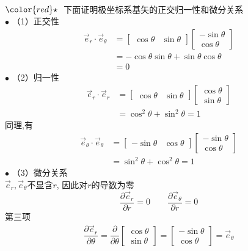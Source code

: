 	~~\\ 
	${\color{red}\star}~$ 下面证明极坐标系基矢的正交归一性和微分关系\\
	$\bullet$ 
	（1）正交性
	$$\begin{aligned}
		\vec{e}_r \cdot \vec{e}_\theta  &= \left[\begin{array}{ccc}
			\cos \theta  &
			\sin \theta 
		\end{array}\right] \left[\begin{array}{ccc}
			-\sin \theta \\
			\cos \theta 
		\end{array}\right]\\ 
		&= - \cos \theta \sin \theta + \sin \theta \cos \theta \\
		&=0
	\end{aligned}
	$$ 
	$\bullet$ 
	（2）归一性
	$$\begin{aligned}
		\vec{e}_r \cdot \vec{e}_r  &= \left[\begin{array}{ccc}
			\cos \theta  &
			\sin \theta 
		\end{array}\right] \left[\begin{array}{ccc}
			\cos \theta \\
			\sin \theta 
		\end{array}\right]\\ 
		&= \cos^2 \theta + \sin ^2 \theta =1
	\end{aligned}
	$$ 
	同理,有 
	$$\begin{aligned}
		\vec{e}_\theta \cdot \vec{e}_\theta  &= \left[\begin{array}{ccc}
			-\sin \theta  &
			\cos \theta
		\end{array}\right] \left[\begin{array}{ccc}
			-\sin \theta \\
			\cos \theta 
		\end{array}\right]\\ 
		&= \sin ^2 \theta+\cos^2 \theta   =1
	\end{aligned}$$ 
	$\bullet$
	（3）微分关系 \\
	 $\vec{e}_{r}, \vec{e}_{\theta}$不显含$r$, 因此对$r$的导数为零
	 $$ \dfrac{\partial \vec{e}_{r}}{\partial r} =0 \qquad \dfrac{\partial \vec{e}_{\theta}}{\partial r} =0  $$
	第三项
	$$
	\begin{aligned}
		\dfrac{\partial \vec{e}_{r}}{\partial \theta} = \dfrac{\partial }{\partial \theta} \left[\begin{array}{ccc}
			\cos \theta  \\
			\sin \theta 
		\end{array}\right]  
		= \left[\begin{array}{ccc}
			-\sin \theta  \\
			\cos\theta 
		\end{array}\right] 
		= \vec{e}_{\theta} 
	\end{aligned} 
	$$ 
